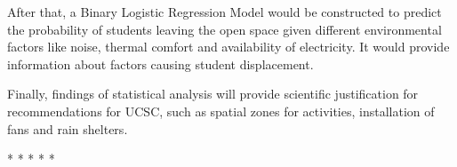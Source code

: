 \documentclass[12pt, a4paper]{report}
\begin{document}
After that, a Binary Logistic Regression Model would be constructed to predict the probability of students leaving the open space given different environmental factors like noise, thermal comfort and availability of electricity. It would provide information about factors causing student displacement.

Finally, findings of statistical analysis will provide scientific justification for recommendations for UCSC, such as spatial zones for activities, installation of fans and rain shelters.

\begin{center}
    * * * * *
\end{center}

\printindex
\end{document}
